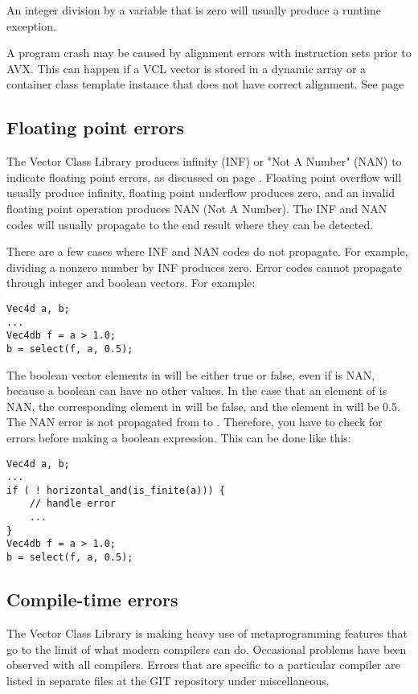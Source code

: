 \documentclass[vcl_manual.tex]{subfiles}
\begin{document}
An integer division by a variable that is zero will usually produce a runtime exception.

A program crash may be caused by alignment errors with instruction sets prior to AVX. This can happen if a VCL vector is stored in a dynamic array or a container class template instance that does not have correct alignment. See page \pageref{Alignment}


\subsection{Floating point errors}\label{FloatingPointErrors}
The Vector Class Library produces infinity (INF) or "Not A Number" (NAN) to indicate floating point errors, as discussed on page \pageref{NoExceptionTrapping}.
Floating point overflow will usually produce infinity, floating point underflow produces zero, and an invalid floating point operation produces NAN (Not A Number). The INF and NAN codes will usually propagate to the end result where they can be detected.

There are a few cases where INF and NAN codes do not propagate. For example, dividing a nonzero number by INF produces zero. Error codes cannot propagate through integer and boolean vectors. For example:

\begin{lstlisting}[frame=none]
Vec4d a, b;
...
Vec4db f = a > 1.0;
b = select(f, a, 0.5);
\end{lstlisting}

The boolean vector elements in  will be either true or false, even if  is NAN, because a boolean can have no other values. 
In the case that an element of  is NAN, the corresponding element in  will be false, and the element in  will be 0.5. The NAN error is not propagated from  to . Therefore, you have to check for errors before making a boolean expression. This can be done like this:

\begin{lstlisting}[frame=none]
Vec4d a, b;
...
if ( ! horizontal_and(is_finite(a))) {
    // handle error
    ...
}
Vec4db f = a > 1.0;
b = select(f, a, 0.5);
\end{lstlisting}


\subsection{Compile-time errors}\label{CompileTimeErrors}
The Vector Class Library is making heavy use of metaprogramming features that go to the limit of what modern compilers can do. Occasional problems have been observed with all compilers.
Errors that are specific to a particular compiler are listed in separate files at the GIT repository under miscellaneous.
\end{document}
